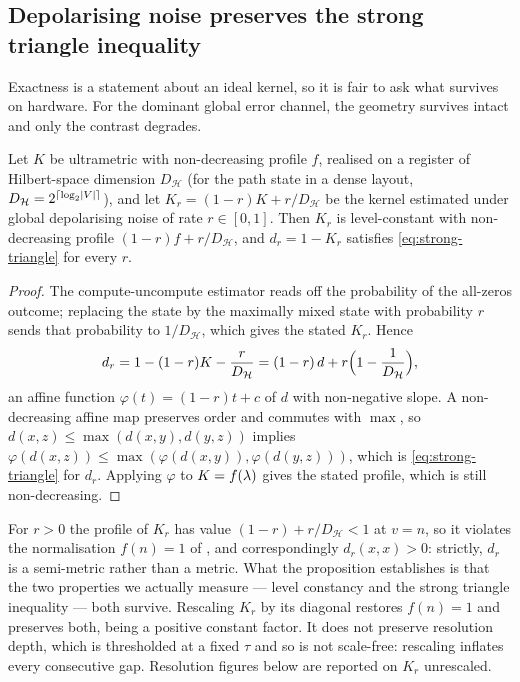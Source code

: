 \subsection{Depolarising noise preserves the strong triangle inequality}

Exactness is a statement about an ideal kernel, so it is fair to ask what survives on
hardware. For the dominant global error channel, the geometry survives intact and only
the contrast degrades.

\begin{proposition}
  \label{prop:depolarising}
  Let $K$ be ultrametric with non-decreasing profile $f$, realised on a register of
  Hilbert-space dimension $D_{\mathcal{H}}$ (for the path state in a dense layout,
  $D_{\mathcal{H}} = 2^{\lceil \log_2 \lvert V\rvert \rceil}$), and let
  $K_r = (1-r) K + r / D_{\mathcal{H}}$ be the kernel estimated under global
  depolarising noise of rate $r \in [0,1]$. Then $K_r$ is level-constant with
  non-decreasing profile $(1-r) f + r / D_{\mathcal{H}}$, and $d_r = 1 - K_r$ satisfies
  \cref{eq:strong-triangle} for every $r$.
\end{proposition}

\begin{proof}
  The compute-uncompute estimator reads off the probability of the all-zeros outcome;
  replacing the state by the maximally mixed state with probability $r$ sends that
  probability to $1 / D_{\mathcal{H}}$, which gives the stated $K_r$. Hence
  \begin{equation*}
    d_r = 1 - (1-r)K - \frac{r}{D_{\mathcal{H}}}
    = (1-r)\,d + r\Bigl(1 - \frac{1}{D_{\mathcal{H}}}\Bigr),
  \end{equation*}
  an affine function $\varphi(t) = (1-r)t + c$ of $d$ with non-negative slope. A
  non-decreasing affine map preserves order and commutes with $\max$, so
  $d(x,z) \le \max(d(x,y), d(y,z))$ implies
  $\varphi(d(x,z)) \le \max(\varphi(d(x,y)), \varphi(d(y,z)))$, which is
  \cref{eq:strong-triangle} for $d_r$. Applying $\varphi$ to $K = f(\lambda)$ gives
  the stated profile, which is still non-decreasing.
\end{proof}

\begin{remark}
  \label{rem:depolarising-caveat}
  For $r > 0$ the profile of $K_r$ has value $(1-r) + r/D_{\mathcal{H}} < 1$ at
  $v = n$, so it violates the normalisation $f(n) = 1$ of
  , and correspondingly $d_r(x,x) > 0$: strictly, $d_r$ is
  a semi-metric rather than a metric. What the proposition establishes is that the two
  properties we actually measure --- level constancy and the strong triangle inequality
  --- both survive. Rescaling $K_r$ by its diagonal restores $f(n) = 1$ and preserves
  both, being a positive constant factor. It does not preserve resolution depth, which
  is thresholded at a fixed $\tau$ and so is not scale-free: rescaling inflates every
  consecutive gap. Resolution figures below are reported on $K_r$ unrescaled.
\end{remark}

